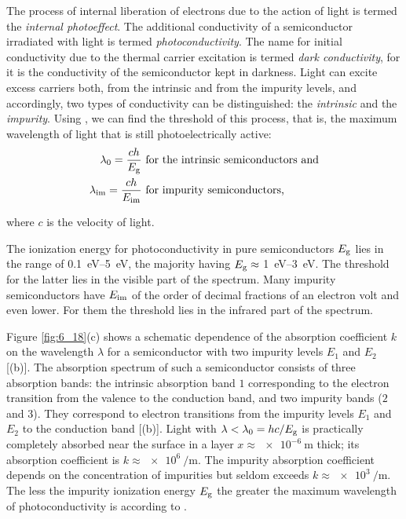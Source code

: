 The process of internal liberation of electrons due to the action of light is termed the \textit{internal photoeffect}. The additional conductivity of a semiconductor irradiated with light is termed \textit{photoconductivity}. The name for initial conductivity due to the thermal carrier excitation is termed \textit{dark conductivity}, for it is the conductivity of the semiconductor kept in darkness. Light can excite excess carriers both, from the intrinsic and from the impurity levels, and accordingly, two types of conductivity can be distinguished: the \textit{intrinsic} and the \textit{impurity}. Using , we can find the threshold of this process, that is, the maximum wavelength of light that is still photoelectrically active:
\begin{equation}\label{eq:6_45}
	\begin{split}
		\lambda_0 = \frac{ch}{E_{\text{g}}}\,\, &\text{for the intrinsic semiconductors and}\\
		\lambda_{\text{im}} = \frac{ch}{E_{\text{im}}}\,\, &\text{for impurity semiconductors,}
	\end{split}
\end{equation}

\noindent
where $c$ is the velocity of light.

The ionization energy for photoconductivity in pure semiconductors $E_{\text{g}}$ lies in the range of \SIrange{0.1}{5}{\electronvolt}, the majority having $E_{\text{g}}\approx$ \SIrange{1}{3}{\electronvolt}. The threshold for the latter lies in the visible part of the spectrum. Many impurity semiconductors have $E_{\text{im}}$ of the order of decimal fractions of an electron volt and even lower. For them the threshold lies in the infrared part of the spectrum.

Figure \ref{fig:6_18}(c) shows a schematic dependence of the absorption coefficient $k$ on the wavelength $\lambda$ for a semiconductor with two impurity levels $E_1$ and $E_2$ [(b)]. The absorption spectrum of such a semiconductor consists of three absorption bands: the intrinsic absorption band $1$ corresponding to the electron transition from the valence to the conduction band, and two impurity bands ($2$ and $3$). They correspond to electron transitions from the impurity levels $E_1$ and $E_2$ to the conduction band [(b)]. Light with $\lambda<\lambda_0=hc/E_{\text{g}}$ is practically completely absorbed near the surface
in a layer $x\approx\SI{e-6}{\metre}$ thick; its absorption coefficient is $k\approx\SI{e6}{\per\metre}$. The impurity absorption coefficient depends on the concentration of impurities but seldom exceeds $k\approx\SI{e3}{\per\metre}$. The less the impurity ionization energy $E_{\text{g}}$ the greater the maximum wavelength of photoconductivity is according to .

